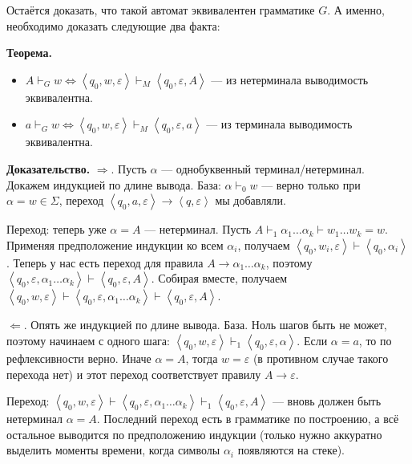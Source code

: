 Остаётся доказать, что такой автомат эквивалентен грамматике $G$. А именно, необходимо доказать следующие два факта:

\textbf{Теорема.}
\begin{itemize}
    \item $A \vdash_G w \iff \left<q_0, w, \varepsilon \right> \vdash_M \left< q_0, \varepsilon, A \right>$ --- из нетерминала выводимость эквивалентна.
    \item $a \vdash_G w \iff \left<q_0, w, \varepsilon \right> \vdash_M \left< q_0, \varepsilon, a \right>$ --- из терминала выводимость эквивалентна.
\end{itemize}

\textbf{Доказательство.}
$\Rightarrow$. Пусть $\alpha$ --- однобуквенный терминал/нетерминал. Докажем индукцией по длине вывода.
База: $\alpha \vdash_0 w$ --- верно только при $\alpha = w \in \Sigma$, переход $\left<q_0, a, \varepsilon \right> \to \left<q, \varepsilon \right>$ мы добавляли.

Переход: теперь уже $\alpha = A$ --- нетерминал. Пусть $A \vdash_1 \alpha_1 \dots \alpha_k \vdash w_1 \dots w_k = w$.
Применяя предположение индукции ко всем $\alpha_i$, получаем $\left<q_0, w_i, \varepsilon \right> \vdash \left<q_0, \alpha_i \right>$.
Теперь у нас есть переход для правила $A \to \alpha_1 \dots \alpha_k$, поэтому $\left<q_0, \varepsilon, \alpha_1 \dots \alpha_k \right> \vdash \left<q_0, \varepsilon, A \right>$.
Собирая вместе, получаем $\left< q_0, w, \varepsilon \right> \vdash \left<q_0, \varepsilon, \alpha_1 \dots \alpha_k \right> \vdash \left<q_0, \varepsilon, A \right>$.

$\Leftarrow$. Опять же индукцией по длине вывода. 
База. Ноль шагов быть не может, поэтому начинаем с одного шага:
$\left<q_0, w, \varepsilon \right> \vdash_1 \left<q_0, \varepsilon, \alpha \right>$.
Если $\alpha = a$, то по рефлексивности верно. Иначе $\alpha = A$, тогда $w = \varepsilon$ (в противном случае такого перехода нет) и этот переход соответствует правилу $A \to \varepsilon$.

Переход: $\left<q_0, w, \varepsilon \right> \vdash \left<q_0, \varepsilon, \alpha_1 \dots \alpha_k \right> \vdash_1 \left<q_0, \varepsilon, A \right>$ --- вновь должен быть нетерминал $\alpha = A$.
Последний переход есть в грамматике по построению, а всё остальное выводится по предположению индукции (только нужно аккуратно выделить моменты времени, когда символы $\alpha_i$ появляются на стеке).

\QED

